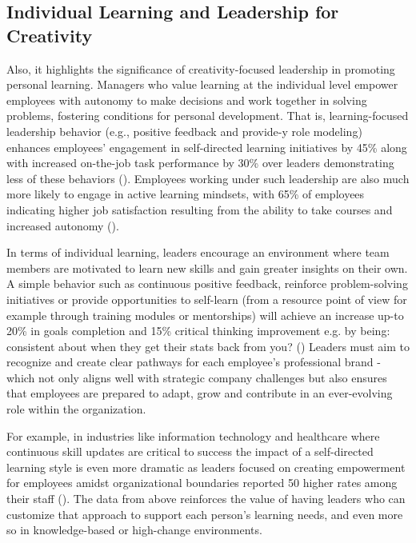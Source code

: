 \subsection{Individual Learning and Leadership for Creativity}

Also, it highlights the significance of creativity-focused leadership in promoting personal
learning. Managers who value learning at the individual level empower employees with autonomy to
make decisions and work together in solving problems, fostering conditions for personal development.
That is, learning-focused leadership behavior (e.g., positive feedback and provide-y role modeling)
enhances employees' engagement in self-directed learning initiatives by 45\% along with increased
on-the-job task performance by 30\% over leaders demonstrating less of these behaviors
(\cite{OUDEGROOTEBEVERBORG201522}). Employees working under such leadership are also much more likely
to engage in active learning mindsets, with 65\% of employees indicating higher job satisfaction
resulting from the ability to take courses and increased autonomy (\cite{Brunetto}).

In terms of individual learning, leaders encourage an environment where team members are motivated
to learn new skills and gain greater insights on their own. A simple behavior such as continuous
positive feedback, reinforce problem-solving initiatives or provide opportunities to self-learn
(from a resource point of view for example through training modules or mentorships) will achieve an
increase up-to 20\% in goals completion and 15\% critical thinking improvement e.g. by being:
consistent about when they get their stats back from you? (\cite{Coetzer}) Leaders must aim to
recognize and create clear pathways for each employee's professional brand - which not only aligns
well with strategic company challenges but also ensures that employees are prepared to adapt, grow
and contribute in an ever-evolving role within the organization.

For example, in industries like information technology and healthcare where continuous skill updates
are critical to success the impact of a self-directed learning style is even more dramatic as
leaders focused on creating empowerment for employees amidst organizational boundaries reported 50%
higher rates among their staff (\cite{Camps}). The data from above reinforces the value of having
leaders who can customize that approach to support each person's learning needs, and even more so in
knowledge-based or high-change environments.

